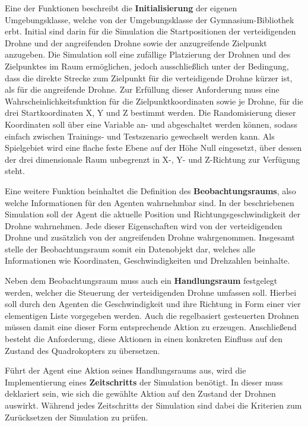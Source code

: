 Eine der Funktionen beschreibt die \textbf{Initialisierung} der eigenen Umgebungsklasse, welche von der Umgebungsklasse der Gymnasium-Bibliothek erbt.
Initial sind darin für die Simulation die Startpositionen der verteidigenden Drohne und der angreifenden Drohne sowie der anzugreifende Zielpunkt anzugeben.
Die Simulation soll eine zufällige Platzierung der Drohnen und des Zielpunktes im Raum ermöglichen, jedoch ausschließlich unter der Bedingung, dass die direkte Strecke zum Zielpunkt für die verteidigende Drohne kürzer ist, als für die angreifende Drohne.
Zur Erfüllung dieser Anforderung muss eine Wahrscheinlichkeitsfunktion für die Zielpunktkoordinaten sowie je Drohne, für die drei Startkoordinaten X, Y und Z bestimmt werden.
Die Randomisierung dieser Koordinaten soll über eine Variable an- und abgeschaltet werden können, sodass einfach zwischen Trainings- und Testszenario gewechselt werden kann.
Als Spielgebiet wird eine flache feste Ebene auf der Höhe Null eingesetzt, über dessen der drei dimensionale Raum unbegrenzt in X-, Y- und Z-Richtung zur Verfügung steht.

Eine weitere Funktion beinhaltet die Definition des \textbf{Beobachtungsraums}, also welche Informationen für den Agenten wahrnehmbar sind. 
In der beschriebenen Simulation soll der Agent die aktuelle Position und Richtungsgeschwindigkeit der Drohne wahrnehmen.
Jede dieser Eigenschaften wird von der verteidigenden Drohne und zusätzlich von der angreifenden Drohne wahrgenommen. 
Insgesamt stelle der Beobachtungsraum somit ein Datenobjekt dar, welches alle Informationen wie Koordinaten, Geschwindigkeiten und Drehzahlen beinhalte.

Neben dem Beobachtungsraum muss auch ein \textbf{Handlungsraum} festgelegt werden, welcher die Steuerung der verteidigenden Drohne umfassen soll.
Hierbei soll durch den Agenten die Geschwindigkeit und ihre Richtung in Form einer vier elementigen Liste vorgegeben werden.
Auch die regelbasiert gesteuerten Drohnen müssen damit eine dieser Form entsprechende Aktion zu erzeugen.
Anschließend besteht die Anforderung, diese Aktionen in einen konkreten Einfluss auf den Zustand des Quadrokopters zu übersetzen.

Führt der Agent eine Aktion seines Handlungsraums aus, wird die Implementierung eines \textbf{Zeitschritts} der Simulation benötigt.
In dieser muss deklariert sein, wie sich die gewählte Aktion auf den Zustand der Drohnen auswirkt.
Während jedes Zeitschritts der Simulation sind dabei die Kriterien zum Zurücksetzen der Simulation zu prüfen.

